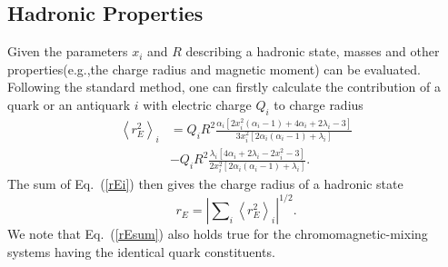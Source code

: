\documentclass[prd,twocolumn,floatfix,nofootinbib]{revtex4}
\begin{document}
\subsection{Hadronic Properties}

Given the parameters $x_{i}$ and $R$ describing a hadronic state, masses and
other properties(e.g.,the charge radius and magnetic moment) can be
evaluated. Following the standard method, one can firstly calculate the
contribution of a quark or an antiquark $i$ with electric charge $Q_{i}$ to
charge radius \cite{DeGrand:1975cf}
\begin{equation}
\begin{aligned} {\left\langle r_{E}^{2} \right\rangle}_{i}&= Q_{i}R^{2}
\frac{\alpha_{i}
\left[2x_{i}^{2}\left(\alpha_{i}-1\right)+4\alpha_{i}+2\lambda_{i}-3\right]}
{3x_{i}^{2} \left[2\alpha_{i}\left(\alpha_{i}-1\right)+\lambda_{i}\right]}
\\ &-Q_{i}R^{2} \frac{\lambda_{i}
\left[4\alpha_{i}+2\lambda_{i}-2x_{i}^{2}-3\right]} {2x_{i}^{2}
\left[2\alpha_{i}\left(\alpha_{i}-1\right)+\lambda_{i}\right]}. \end{aligned}
\label{rEi}
\end{equation}%
The sum of Eq.~(\ref{rEi}) then gives the charge radius of a hadronic state
\cite{Chodos:1974pn}
\begin{equation}
r_{E}={\left\vert \sum\nolimits_{i}{\left\langle r_{E}^{2}\right\rangle }%
_{i}\right\vert }^{1/2}.  \label{rEsum}
\end{equation}%
We note that Eq.~(\ref{rEsum}) also holds true for the chromomagnetic-mixing
systems having the identical quark constituents.
\end{document}
